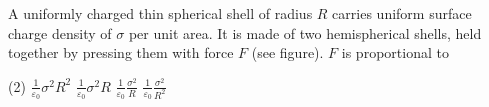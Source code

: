 
\item A uniformly charged thin spherical shell of radius \( R \) carries uniform surface charge density of \( \sigma \) per unit area. It is made of two hemispherical shells, held together by pressing them with force \( F \) (see figure). \( F \) is proportional to
    \begin{center}
    \end{center}
    \begin{tasks}(2)
        \task \(\frac{1}{\varepsilon_0}\sigma^2 R^2\)
        \task \(\frac{1}{\varepsilon_0}\sigma^2 R\)
        \task \(\frac{1}{\varepsilon_0}\frac{\sigma^2}{R}\)
        \task \(\frac{1}{\varepsilon_0}\frac{\sigma^2}{R^2}\)
    \end{tasks}
